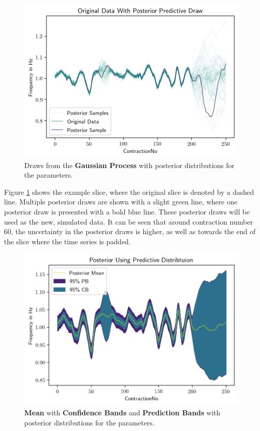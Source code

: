 \documentclass[11pt]{scrartcl}
\begin{document}
\begin{figure}[hbt]
	\center
	\includegraphics[width=1.0\textwidth]{img/gp/gp_data_example_posterior_predictive.png}
	\caption{Draws from the \textcolor{viridis5}{\textbf{Gaussian Process}} with posterior distributions for the parameters.}
	\label{fig:gp_data_example_posterior_predictive}
\end{figure}

Figure \ref{fig:gp_data_example_posterior_predictive} shows the example slice, where the original slice is denoted by a dashed line. Multiple posterior draws are shown with a slight green line, where one posterior draw is presented with a bold blue line. These posterior draws will be used as the new, simulated data. It can be seen that around contraction number 60, the uncertainty in the posterior draws is higher, as well as towards the end of the slice where the time series is padded.


\begin{figure}[hbt]
	\center
	\includegraphics[width=1.0\textwidth]{img/gp/gp_data_example_posterior_intervals_predictive.png}
	\caption{\textcolor{viridis9}{\textbf{Mean}} with \textcolor{viridis3}{\textbf{Confidence Bands}} and \textcolor{viridis0}{\textbf{Prediction Bands}} with posterior distributions for the parameters.}
	\label{fig:gp_data_example_posterior_intervals_predictive}
\end{figure}
\end{document}
